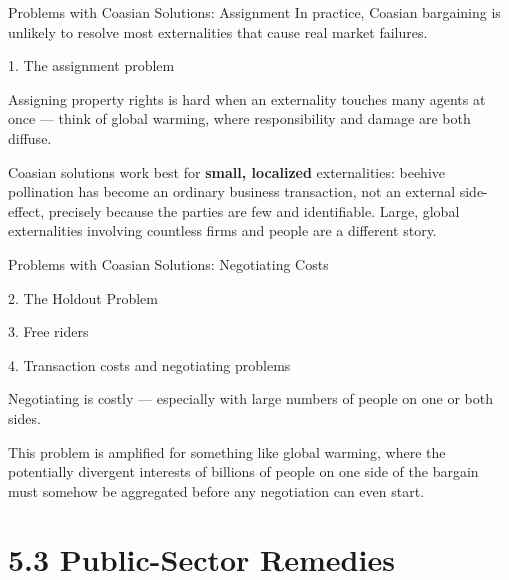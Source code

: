 \documentclass[11pt,aspectratio=169]{beamer}
\begin{document}
\begin{frame}{Problems with Coasian Solutions: Assignment}
  In practice, Coasian bargaining is unlikely to resolve most externalities that cause real market failures.
  \begin{block}{1. The assignment problem}
    \end{block}
    Assigning property rights is hard when an externality touches many agents at once --- think of global warming, where responsibility and damage are both diffuse.

  \small Coasian solutions work best for \textbf{small, localized} externalities: beehive pollination has become an ordinary business transaction, not an external side-effect, precisely because the parties are few and identifiable. Large, global externalities involving countless firms and people are a different story.
\end{frame}

\begin{frame}{Problems with Coasian Solutions: Negotiating Costs}
	  \begin{block}{2. The Holdout Problem}
	\end{block}
	\begin{block}{3. Free riders}
		
	\end{block}
  \begin{block}{4. Transaction costs and negotiating problems}
    \end{block}
    Negotiating is costly --- especially with large numbers of people on one or both sides.

  \small This problem is amplified for something like global warming, where the potentially divergent interests of billions of people on one side of the bargain must somehow be aggregated before any negotiation can even start.
  \vspace{0.6em}

 

\end{frame}

\section{5.3 Public-Sector Remedies}
\end{document}
